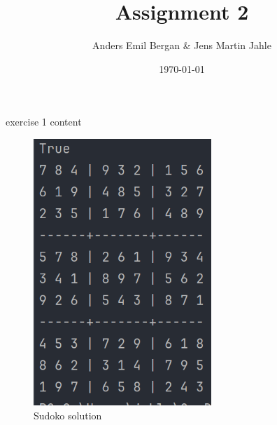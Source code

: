 \documentclass[11pt]{article}
\begin{document}
\title{Assignment 2}
\author{Anders Emil Bergan \& Jens Martin Jahle}
\date{\today}

\maketitle
{}
exercise 1 content


\begin{figure}[h!]
    \centering
    \includegraphics[width=0.6\textwidth]{images/sudoko}
    \caption{Sudoko solution}
    \label{fig:example}
\end{figure}
\end{document}
